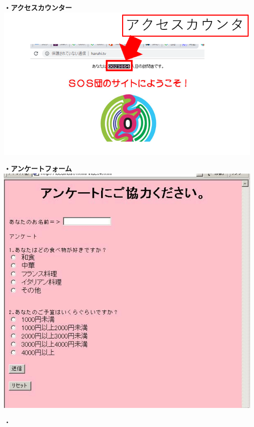 \documentclass[a4paper,12pt,dvipdfmx]{jarticle}
\begin{document}
\centering
\begin{minipage}{\textwidth}
          \begin{minipage}{0.45\textwidth}
	   \textbf{・アクセスカウンター}\\
	   \centering
            {\upshape
              \centering
              \includegraphics[width=0.8\linewidth]{ome7-img046.png}}
          \end{minipage}
          \begin{minipage}{0.45\textwidth}
	   \textbf{・アンケートフォーム}\\
	   \centering
            {\upshape
              \centering
              \includegraphics[width=0.8\linewidth]{ome7-img047.png}}
            \end{minipage}
\end{minipage}
\flushleft


\bigskip

{\bfseries

	・}
\end{document}
